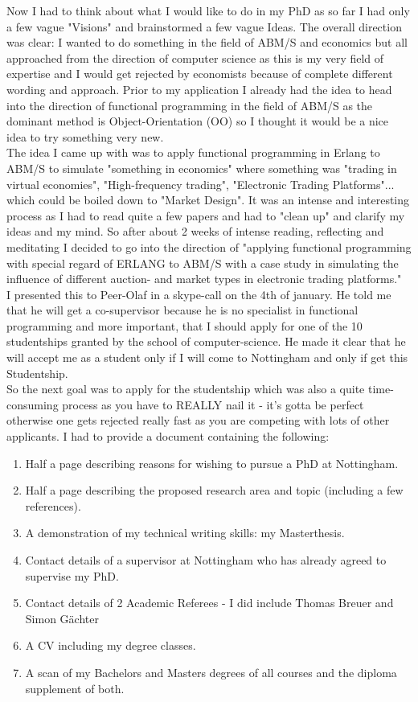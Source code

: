 Now I had to think about what I would like to do in my PhD as so far I had only a few vague "Visions" and brainstormed a few vague Ideas. The overall direction was clear: I wanted to do something in the field of ABM/S and economics but all approached from the direction of computer science as this is my very field of expertise and I would get rejected by economists because of complete different wording and approach. Prior to my application I already had the idea to head into the direction of functional programming in the field of ABM/S as the dominant method is Object-Orientation (OO) so I thought it would be a nice idea to try something very new. \\
The idea I came up with was to apply functional programming in Erlang to ABM/S to simulate "something in economics" where something was "trading in virtual economies", "High-frequency trading", "Electronic Trading Platforms"... which could be boiled down to "Market Design". It was an intense and interesting process as I had to read quite a few papers and had to "clean up" and clarify my ideas and my mind. So after about 2 weeks of intense reading, reflecting and meditating I decided to go into the direction of "applying functional programming with special regard of ERLANG to ABM/S with a case study in simulating the influence of different auction- and market types in electronic trading platforms." \\
I presented this to Peer-Olaf in a skype-call on the 4th of january. He told me that he will get a co-supervisor because he is no specialist in functional programming and more important, that I should apply for one of the 10 studentships granted by the school of computer-science. He made it clear that he will accept me as a student only if I will come to Nottingham and only if get this Studentship. \\
So the next goal was to apply for the studentship which was also a quite time-consuming process as you have to REALLY nail it - it's gotta be perfect otherwise one gets rejected really fast as you are competing with lots of other applicants. I had to provide a document containing the following:

\begin{enumerate}
\item Half a page describing reasons for wishing to pursue a PhD at Nottingham.
\item Half a page describing the proposed research area and topic (including a few references).
\item A demonstration of my technical writing skills: my Masterthesis.
\item Contact details of a supervisor at Nottingham who has already agreed to supervise my PhD.
\item Contact details of 2 Academic Referees - I did include Thomas Breuer and Simon Gächter
\item A CV including my degree classes.
\item A scan of my Bachelors and Masters degrees of all courses and the diploma supplement of both.
\end{enumerate}
      
